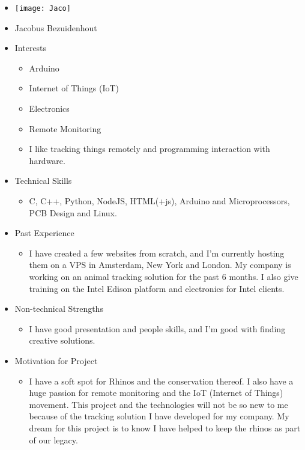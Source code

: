 
\begin{itemize}
	\item[] \texttt{[image: Jaco]}
	\item[] Jacobus Bezuidenhout
	\item Interests
	\begin{itemize}
		\item Arduino
		\item Internet of Things (IoT)
		\item Electronics
		\item Remote Monitoring
		\item I like tracking things remotely and programming interaction with hardware.
	\end{itemize}
	\item Technical Skills
	\begin{itemize}
		\item[] C, C++, Python, NodeJS, HTML(+js), Arduino and Microprocessors, PCB Design and Linux.
	\end{itemize}
	\item Past Experience
	\begin{itemize}
		\item[] I have created a few websites from scratch, and I'm currently hosting them on a VPS in Amsterdam, New York and London. My company is working on an animal tracking solution for the past 6 months. I also give training on the Intel Edison platform and electronics for Intel clients.
	\end{itemize}
	\item Non-technical Strengths
	\begin{itemize}
		\item[] I have good presentation and people skills, and I'm good with finding creative solutions.
	\end{itemize}
	\item Motivation for Project
	\begin{itemize}
		\item[] I have a soft spot for Rhinos and the conservation thereof. I also have a huge passion for remote monitoring and the IoT (Internet of Things) movement. This project and the technologies will not be so new to me because of the tracking solution I have developed for my company. My dream for this project is to know I have helped to keep the rhinos as part of our legacy.
	\end{itemize}
\end{itemize}